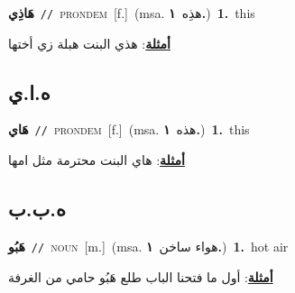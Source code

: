 \documentclass[10pt,a4paper,twoside]{article} %
\begin{document}
\begin{multicols}{2}
{\setlength\topsep{0pt}\textbf{\foreignlanguage{arabic}{هَاذِي}}\ {\color{gray}\texttt{//}\color{black}}\ \textsc{pron\textunderscore dem}\ [f.]\ \color{gray}(msa. \foreignlanguage{arabic}{هذِه}~\foreignlanguage{arabic}{\textbf{١.}})\color{black}\ \textbf{1.}~this\  \begin{flushright}\color{gray}\foreignlanguage{arabic}{\textbf{\underline{\foreignlanguage{arabic}{أمثلة}}}: هذي البنت هبلة زي أختها}\end{flushright}\color{black}} \vspace{2mm}

\vspace{-3mm}
\subsection*{\color{blue}\foreignlanguage{arabic}{ه.ا.ي}\color{blue}{ (ntws)}} 

{\setlength\topsep{0pt}\textbf{\foreignlanguage{arabic}{هَاي}}\ {\color{gray}\texttt{//}\color{black}}\ \textsc{pron\textunderscore dem}\ [f.]\ \color{gray}(msa. \foreignlanguage{arabic}{هذه}~\foreignlanguage{arabic}{\textbf{١.}})\color{black}\ \textbf{1.}~this\  \begin{flushright}\color{gray}\foreignlanguage{arabic}{\textbf{\underline{\foreignlanguage{arabic}{أمثلة}}}: هاي البنت محترمة مثل امها}\end{flushright}\color{black}} \vspace{2mm}

\vspace{-3mm}
\subsection*{\color{blue}\foreignlanguage{arabic}{ه.ب.ب}\color{blue}{}} 

{\setlength\topsep{0pt}\textbf{\foreignlanguage{arabic}{هَبُو}}\ {\color{gray}\texttt{//}\color{black}}\ \textsc{noun}\ [m.]\ \color{gray}(msa. \foreignlanguage{arabic}{هواء ساخن}~\foreignlanguage{arabic}{\textbf{١.}})\color{black}\ \textbf{1.}~hot air\  \begin{flushright}\color{gray}\foreignlanguage{arabic}{\textbf{\underline{\foreignlanguage{arabic}{أمثلة}}}: أول ما فتحنا الباب طلع هَبُو حامي من الغرفة}\end{flushright}\color{black}} \vspace{2mm}


\end{multicols}
\end{document}
